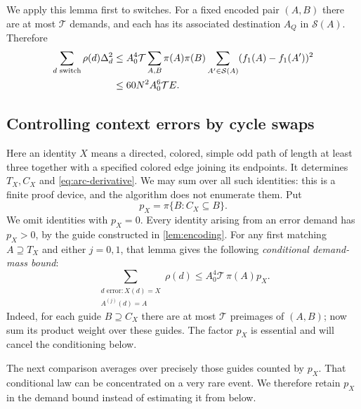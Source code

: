 \documentclass[11pt]{article}
\theoremstyle{definition}
\theoremstyle{remark}
\newcommand{\calT}{\mathcal T}
\numberwithin{equation}{section}
\begin{document}
We apply this lemma first to switches.  For a fixed encoded pair
$(A,B)$ there are at most $\calT$ demands, and each has its associated
destination $A_Q$ in $\mathcal S(A)$.  Therefore
\begin{align}
 \sum_{d\text{ switch}}\rho(d)\Delta_d^2
 &\le A_0^4\calT\sum_{A,B}\pi(A)\pi(B)
       \sum_{A'\in\mathcal S(A)}(f_1(A)-f_1(A'))^2 \notag\\
 &\le60N^2A_0^6\calT E.
 \label{eq:switch-demand-load}
\end{align}

\subsection{Controlling context errors by cycle swaps}

Here an identity $X$ means a directed, colored, simple odd path of
length at least three together with a specified colored edge joining
its endpoints.  It determines $T_X,C_X$ and \eqref{eq:arc-derivative}.
We may sum over all such identities: this is a finite proof device,
and the algorithm does not enumerate them.  Put
\[
 p_X=\pi\{B:C_X\subseteq B\}.
\]
We omit identities with $p_X=0$.  Every identity arising from an error
demand has $p_X>0$, by the guide constructed in \cref{lem:encoding}.
For any first matching $A\supseteq T_X$ and either $j=0,1$,
that lemma gives the following \emph{conditional demand-mass bound}:
\begin{equation}
\label{eq:conditional-demand-mass}
 \sum_{\substack{d\text{ error}:X(d)=X\\ A^{(j)}(d)=A}}
       \rho(d)
 \le A_0^4\calT\,\pi(A)p_X.
\end{equation}
Indeed, for each guide $B\supseteq C_X$ there are at most $\calT$
preimages of $(A,B)$; now sum its product weight over these guides.
The factor $p_X$ is essential and will cancel the conditioning below.

The next comparison averages over precisely those guides counted by
$p_X$. That conditional law can be concentrated on a very rare event.
We therefore retain $p_X$ in the demand bound instead of estimating it
from below.
\end{document}
